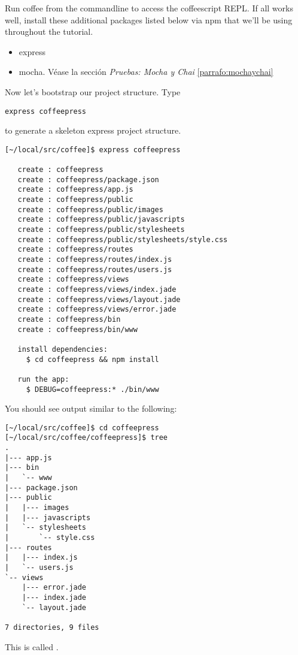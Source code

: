 Run coffee from the commandline to access the coffeescript
REPL. If all works well, install these additional packages listed below
via npm that we’ll be using throughout the tutorial.

\begin{itemize}
\item
express
\item
mocha. 
Véase la sección {\it Pruebas: Mocha y Chai}
\ref{parrafo:mochaychai}
\end{itemize}


Now let’s bootstrap our project structure. Type 
\begin{verbatim}
express coffeepress 
\end{verbatim}
to generate a skeleton express project structure. 
\begin{verbatim}
[~/local/src/coffee]$ express coffeepress

   create : coffeepress
   create : coffeepress/package.json
   create : coffeepress/app.js
   create : coffeepress/public
   create : coffeepress/public/images
   create : coffeepress/public/javascripts
   create : coffeepress/public/stylesheets
   create : coffeepress/public/stylesheets/style.css
   create : coffeepress/routes
   create : coffeepress/routes/index.js
   create : coffeepress/routes/users.js
   create : coffeepress/views
   create : coffeepress/views/index.jade
   create : coffeepress/views/layout.jade
   create : coffeepress/views/error.jade
   create : coffeepress/bin
   create : coffeepress/bin/www

   install dependencies:
     $ cd coffeepress && npm install

   run the app:
     $ DEBUG=coffeepress:* ./bin/www
\end{verbatim}

You should see output similar to the following:
\begin{verbatim}
[~/local/src/coffee]$ cd coffeepress
[~/local/src/coffee/coffeepress]$ tree
.
|--- app.js
|--- bin
|   `-- www
|--- package.json
|--- public
|   |--- images
|   |--- javascripts
|   `-- stylesheets
|       `-- style.css
|--- routes
|   |--- index.js
|   `-- users.js
`-- views
    |--- error.jade
    |--- index.jade
    `-- layout.jade

7 directories, 9 files

\end{verbatim}

This is called .

